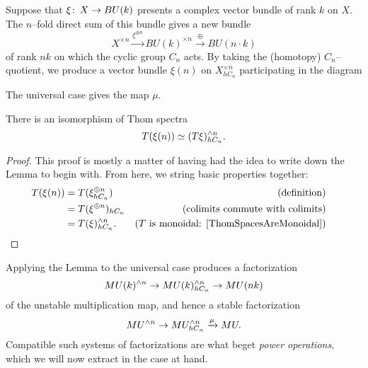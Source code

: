 \begin{definition}
Suppose that $\xi\colon\thinspace X \to BU(k)$ presents a complex vector bundle of rank $k$ on $X$.  The $n$--fold direct sum of this bundle gives a new bundle \[X^{\times n} \xrightarrow{\xi^{\oplus n}} BU(k)^{\times n} \xrightarrow{\oplus} BU(n \cdot k)\] of rank $nk$ on which the cyclic group $C_n$ acts.  By taking the (homotopy) $C_n$--quotient, we produce a vector bundle $\xi(n)$ on $X^{\times n}_{hC_n}$ participating in the diagram
\begin{center}
\end{center}
The universal case gives the map $\mu$.
\end{definition}

\begin{lemma}
There is an isomorphism of Thom spectra \[T(\xi(n)) \simeq (T\xi)^{\wedge n}_{hC_n}.\]
\end{lemma}
\begin{proof}
This proof is mostly a matter of having had the idea to write down the Lemma to begin with.  From here, we string basic properties together:
\begin{align*}
T(\xi(n)) & = T(\xi^{\oplus n}_{hC_n}) & \text{(definition)} \\
& = T(\xi^{\oplus n})_{hC_n} & \text{(colimits commute with colimits)} \\
& = T(\xi)^{\sm n}_{hC_n}. & \text{($T$ is monoidal: \Cref{ThomSpacesAreMonoidal})} & \qedhere
\end{align*}
\end{proof}

Applying the Lemma to the universal case produces a factorization \[MU(k)^{\wedge n} \to MU(k)^{\wedge n}_{hC_n} \to MU(nk)\] of the unstable multiplication map, and hence a stable factorization \[MU^{\wedge n} \to MU^{\wedge n}_{hC_n} \xrightarrow{\mu} MU.\]  Compatible such systems of factorizations are what beget \textit{power operations}, which we will now extract in the case at hand.

